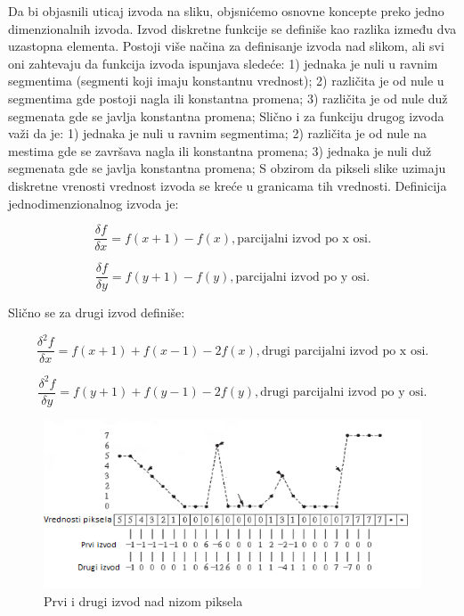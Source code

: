 \documentclass[a4paper,12pt,titlepage]{article}
\begin{document}
Da bi objasnili uticaj izvoda na sliku, objsnićemo osnovne koncepte preko jedno dimenzionalnih izvoda. Izvod diskretne funkcije se definiše kao razlika između dva uzastopna elementa. Postoji više načina za definisanje izvoda nad slikom, ali svi oni zahtevaju da funkcija izvoda ispunjava sledeće: 1) jednaka je nuli u ravnim segmentima (segmenti koji imaju konstantnu vrednost); 2) različita je od nule u segmentima gde postoji nagla ili konstantna promena; 3) različita je od nule duž segmenata gde se javlja konstantna promena; Slično i za funkciju drugog izvoda važi da je: 1)  jednaka je nuli u ravnim segmentima; 2) različita je od nule na mestima gde se završava nagla ili konstantna promena; 3) jednaka je nuli duž segmenata gde se javlja konstantna promena; S obzirom da pikseli slike uzimaju diskretne vrenosti vrednost izvoda se kreće u granicama tih vrednosti. Definicija jednodimenzionalnog izvoda je: 

\begin{equation}\label{eq:izvod}
\dfrac{\delta f}{\delta x} = f(x + 1) - f(x), \text{parcijalni izvod po x osi}.
\end{equation}

\begin{equation}\label{eq:izvod123}
\dfrac{\delta f}{\delta y} = f(y + 1) - f(y), \text{parcijalni izvod po y osi}.
\end{equation}

Slično se za drugi izvod definiše:

\begin{equation}\label{eq:izvod2}
\dfrac{\delta^2 f}{\delta x} = f(x + 1) + f(x - 1) - 2f(x), \text{drugi parcijalni izvod po x osi}.
\end{equation}

\begin{equation}\label{eq:izvod1234}
\dfrac{\delta^2 f}{\delta y} = f(y + 1) + f(y - 1) - 2f(y), \text{drugi parcijalni izvod po y osi}.
\end{equation}

\begin{figure}[ht!]
\centering
\includegraphics[width=120mm]{img/izvod.png}
\caption{Prvi i drugi izvod nad nizom piksela}
\label{overflow}
\end{figure}
\end{document}
